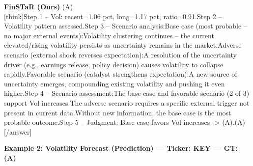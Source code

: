\begin{minipage}[t]{0.41\textwidth}
\colorbox{green!10}{\parbox{\dimexpr\textwidth-2\fboxsep}{
\textbf{FinSTaR (Ours)} \textcolor{green!50!black}{(A)} \\[2pt]
\tiny
[think]\newline Step 1 -- Vol: recent=1.06 pct, long=1.17 pct, ratio=0.91.\newline Step 2 -- Volatility pattern assessed.\newline Step 3 -- Scenario analysis:\newline   Base case (most probable -- no major external events):\newline     Volatility clustering continues -- the current elevated/rising volatility persists as uncertainty remains in the market.\newline   Adverse scenario (external shock reverses expectation):\newline     A resolution of the uncertainty driver (e.g., earnings release, policy decision) causes volatility to collapse rapidly.\newline   Favorable scenario (catalyst strengthens expectation):\newline     A new source of uncertainty emerges, compounding existing volatility and pushing it even higher.\newline Step 4 -- Scenario assessment:\newline   The base case and favorable scenario (2 of 3) support Vol increases.\newline   The adverse scenario requires a specific external trigger not present in current data.\newline   Without new information, the base case is the most probable outcome.\newline Step 5 -- Judgment: Base case favors Vol increases -> (A).\newline [/think]\newline [answer](A)[/answer]
}}
\end{minipage}
\vspace{8pt}


\noindent
\textbf{Example 2: Volatility Forecast (Prediction) --- Ticker: KEY --- GT: (A)}
\vspace{2pt}

